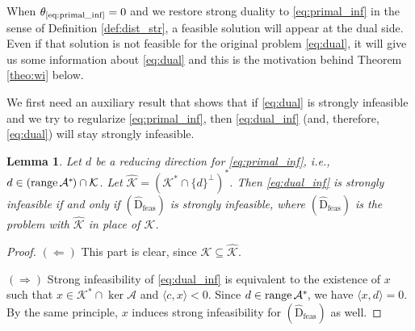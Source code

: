 \documentclass{article}
\newcommand{\inProd}[2]{\langle #1 , #2 \rangle }
\newcommand{\stdMap}{ {\mathcal{A}}}
\newcommand{\stdCone}{ {\mathcal{K}}}
\newcommand{\opt}[1]{ {\theta _{#1}}}
\newcommand{\matRange}{{\mathrm{ range } \,}}
\newcommand{\T}{\ast\hspace{-1pt}}
\newtheorem{lemma}[definition]{Lemma}
\begin{document}
When $\opt{\text{\ref{eq:primal_inf}}} = 0$ and we restore strong duality to \eqref{eq:primal_inf} in the sense of Definition \ref{def:dist_str}, 
a feasible solution will appear at the dual side. Even if that solution is not feasible for the original problem \eqref{eq:dual},
it will give us some information about \eqref{eq:dual} and this is the motivation  behind Theorem \ref{theo:wi} below.

We first need an auxiliary result that shows that if \eqref{eq:dual} is strongly infeasible and 
we try to regularize \eqref{eq:primal_inf}, then \eqref{eq:dual_inf} (and, therefore, \eqref{eq:dual}) will stay strongly infeasible.


\begin{lemma}\label{lema:str_inf_preserv}
Let $d$ be a reducing direction for \eqref{eq:primal_inf}, i.e., 
$d \in (\matRange \stdMap^\T)  \cap \stdCone$.  Let
 $\hat \stdCone = (\stdCone^*\cap \{d\}^\perp)^*$. Then \eqref{eq:dual_inf} is strongly 
infeasible if and only if $(\hat{\text{D}}_{\text{feas}})$ is strongly infeasible, where $(\hat{\text{D}}_{\text{feas}})$ is the problem 
with $\hat \stdCone$ in place of $\stdCone$.
\end{lemma}
\begin{proof}
$(\Leftarrow)$ This part is clear, since $\stdCone \subseteq \hat \stdCone$.
	
	$(\Rightarrow)$ Strong infeasibility of \eqref{eq:dual_inf}
	is equivalent to the existence of 
	$x$ such that $x \in \stdCone^*\cap \ker \stdMap$ and $\inProd{c}{x} < 0$. 
	Since 
	$d \in  \matRange \stdMap^\T $, we have $\inProd{x}{d} = 0$. By the same principle, 
	$x$ induces strong infeasibility for $(\hat{\text{D}}_{\text{feas}})$ as well. 
\end{proof}
 
\end{document}
